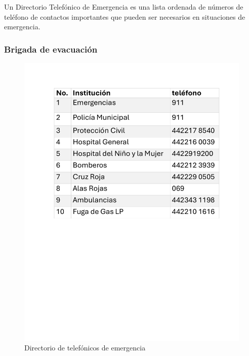     Un Directorio Telefónico de Emergencia es una lista ordenada de números de teléfono de contactos importantes que pueden ser necesarios en situaciones de emergencia. 
    \subsubsection{Brigada de evacuación}
    \begin{figure}[H]
        \centering
        \includegraphics[scale=0.4]{13/img/directrorio.pdf}
        \caption{Directorio de telefónicos de emergencia}
    \end{figure}
    
